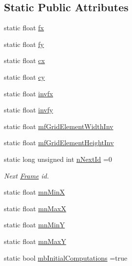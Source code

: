 \subsection*{Static Public Attributes}
\begin{DoxyCompactItemize}
\item 
static float \mbox{\hyperlink{class_o_r_b___s_l_a_m2_1_1_frame_ab505e3f86afa1c3d16b98fda89ec394c}{fx}}
\item 
static float \mbox{\hyperlink{class_o_r_b___s_l_a_m2_1_1_frame_a226a0adc90bc7a09502fc4db00ee20d7}{fy}}
\item 
static float \mbox{\hyperlink{class_o_r_b___s_l_a_m2_1_1_frame_a5f2803f215bc30016bd0833d8c7d5942}{cx}}
\item 
static float \mbox{\hyperlink{class_o_r_b___s_l_a_m2_1_1_frame_abf6a631b787270da2d5b3c0f53615b62}{cy}}
\item 
static float \mbox{\hyperlink{class_o_r_b___s_l_a_m2_1_1_frame_a617c29a929afd74d599c9e41fc71abea}{invfx}}
\item 
static float \mbox{\hyperlink{class_o_r_b___s_l_a_m2_1_1_frame_ad1dfdeb6378b11477c1b94233f881345}{invfy}}
\item 
static float \mbox{\hyperlink{class_o_r_b___s_l_a_m2_1_1_frame_afc2f7799428918dbbf46f7dfc4ccd59d}{mf\+Grid\+Element\+Width\+Inv}}
\item 
static float \mbox{\hyperlink{class_o_r_b___s_l_a_m2_1_1_frame_a010327bee872485894b5905d17462086}{mf\+Grid\+Element\+Height\+Inv}}
\item 
static long unsigned int \mbox{\hyperlink{class_o_r_b___s_l_a_m2_1_1_frame_a1ea8a00151931d155747283850467733}{n\+Next\+Id}} =0
\begin{DoxyCompactList}\small\item\em Next \mbox{\hyperlink{class_o_r_b___s_l_a_m2_1_1_frame}{Frame}} id. \end{DoxyCompactList}\item 
static float \mbox{\hyperlink{class_o_r_b___s_l_a_m2_1_1_frame_ac119d458dd562196240e72b7dbb54f3d}{mn\+MinX}}
\item 
static float \mbox{\hyperlink{class_o_r_b___s_l_a_m2_1_1_frame_ade32bf37203ae9578e4bd9a02cc0f7c1}{mn\+MaxX}}
\item 
static float \mbox{\hyperlink{class_o_r_b___s_l_a_m2_1_1_frame_a38d30251e5bf5e44411e83b688dfac97}{mn\+MinY}}
\item 
static float \mbox{\hyperlink{class_o_r_b___s_l_a_m2_1_1_frame_ac63dd82413eba002462109e625207ab4}{mn\+MaxY}}
\item 
static bool \mbox{\hyperlink{class_o_r_b___s_l_a_m2_1_1_frame_a9f57238f88850695d8cf032b5af0dad6}{mb\+Initial\+Computations}} =true
\end{DoxyCompactItemize}


